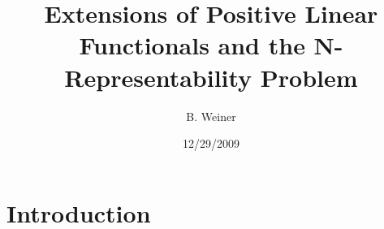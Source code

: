 \documentclass[aps,preprint]{revtex4}%
\begin{document}
\preprint{ }
\title[Positive Functionals]{Extensions of Positive Linear Functionals and the N-Representability Problem }
\author{B. Weiner}

\begin{abstract}


\end{abstract}
\date{12/29/2009}
\maketitle
\tableofcontents


\section{Introduction}
\end{document}
